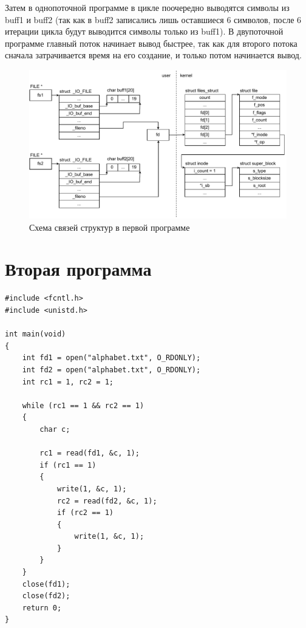 Затем в однопоточной программе в цикле поочередно выводятся символы из buff1 и buff2 (так как в buff2 записались лишь оставшиеся 6 символов, после 6 итерации цикла будут выводится символы только из buff1). В двупоточной программе главный поток начинает вывод быстрее, так как для второго потока сначала затрачивается время на его создание, и только потом начинается вывод.

\begin{figure}[H]
	\centering
	\includegraphics[scale=0.9]{inc/img/task01.pdf}
	\caption{Схема связей структур в первой программе}
	\label{fig:prog_01_thread}
\end{figure}

\chapter{Вторая программа}

\begin{center}
\captionsetup{justification=raggedright,singlelinecheck=off}
\begin{lstlisting}[label=lst:add,caption=Вторая программа 1 вариант]
#include <fcntl.h>
#include <unistd.h>

int main(void)
{
    int fd1 = open("alphabet.txt", O_RDONLY);
    int fd2 = open("alphabet.txt", O_RDONLY);
    int rc1 = 1, rc2 = 1;

    while (rc1 == 1 && rc2 == 1)
    {
        char c;

        rc1 = read(fd1, &c, 1);
        if (rc1 == 1)
        {
            write(1, &c, 1);
            rc2 = read(fd2, &c, 1);
            if (rc2 == 1)
            {
                write(1, &c, 1);
            }
        }
    }
    close(fd1);
    close(fd2);
    return 0;
}
\end{lstlisting}
\end{center}

